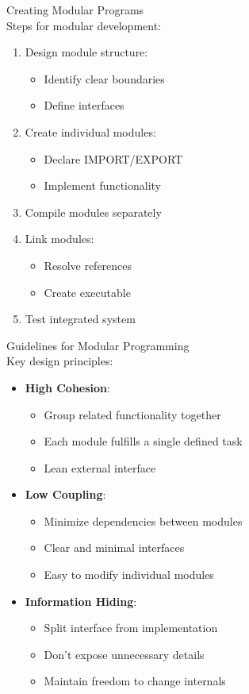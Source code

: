 \begin{KR}{Creating Modular Programs}\\
Steps for modular development:
\begin{enumerate}
  \item Design module structure:
    \begin{itemize}
      \item Identify clear boundaries
      \item Define interfaces
    \end{itemize}
  \item Create individual modules:
    \begin{itemize}
      \item Declare IMPORT/EXPORT
      \item Implement functionality
    \end{itemize}
  \item Compile modules separately
  \item Link modules:
    \begin{itemize}
      \item Resolve references
      \item Create executable
    \end{itemize}
  \item Test integrated system
\end{enumerate}
\end{KR}

\begin{concept}{Guidelines for Modular Programming}\\
Key design principles:
\begin{itemize}
  \item \textbf{High Cohesion}:
    \begin{itemize}
      \item Group related functionality together
      \item Each module fulfills a single defined task
      \item Lean external interface
    \end{itemize}
  \item \textbf{Low Coupling}:
    \begin{itemize}
      \item Minimize dependencies between modules
      \item Clear and minimal interfaces
      \item Easy to modify individual modules
    \end{itemize}
  \item \textbf{Information Hiding}:
    \begin{itemize}
      \item Split interface from implementation
      \item Don't expose unnecessary details
      \item Maintain freedom to change internals
    \end{itemize}
\end{itemize}
\end{concept}

